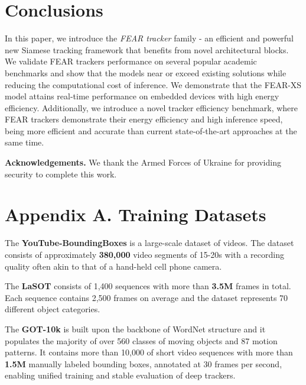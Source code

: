 \documentclass[runningheads]{llncs}
\begin{document}
%
 
\section{Conclusions} 
In this paper, we introduce the \emph{FEAR tracker} family - an efficient and powerful new Siamese tracking framework that benefits from novel architectural blocks.
We validate FEAR trackers performance on several popular academic benchmarks and show that the models near or exceed existing solutions while reducing the computational cost of inference. 
We demonstrate that the FEAR-XS model attains real-time performance on embedded devices with high energy efficiency.
Additionally, we introduce a novel tracker efficiency benchmark, where FEAR trackers demonstrate their energy efficiency and high inference speed, being more efficient and accurate than current state-of-the-art approaches at the same time.






\textbf{Acknowledgements.} We thank the Armed Forces of Ukraine for providing security to complete this work.



\clearpage



\newpage
\section*{Appendix A. Training Datasets}

The \textbf{YouTube-BoundingBoxes} \cite{YouTubeBB} is a large-scale dataset of videos.
The dataset consists of approximately \textbf{380,000} video segments of 15-20s
with a recording quality often akin to that of a hand-held cell phone camera.


The \textbf{LaSOT} \cite{LaSOT} 
consists of 1,400 sequences with more than \textbf{3.5M} frames in total. 
Each sequence contains 2,500 frames on average and the dataset represents 70 different object categories.

The \textbf{GOT-10k} \cite{GOT10k} is built upon the backbone of WordNet structure \cite{WordNet} and it populates the majority of over 560 classes of moving objects and 87 motion patterns. It contains more than 10,000 of short video sequences with  more than \textbf{1.5M} manually labeled bounding boxes, annotated at 30 frames per second, enabling unified training and stable evaluation of deep trackers. 
\end{document}
